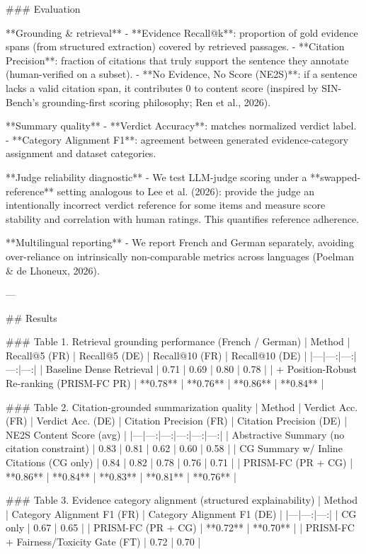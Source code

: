 ### Evaluation  

**Grounding & retrieval**
- **Evidence Recall@k**: proportion of gold evidence spans (from structured extraction) covered by retrieved passages.
- **Citation Precision**: fraction of citations that truly support the sentence they annotate (human-verified on a subset).
- **No Evidence, No Score (NE2S)**: if a sentence lacks a valid citation span, it contributes 0 to content score (inspired by SIN-Bench’s grounding-first scoring philosophy; Ren et al., 2026).

**Summary quality**
- **Verdict Accuracy**: matches normalized verdict label.
- **Category Alignment F1**: agreement between generated evidence-category assignment and dataset categories.

**Judge reliability diagnostic**
- We test LLM-judge scoring under a **swapped-reference** setting analogous to Lee et al. (2026): provide the judge an intentionally incorrect verdict reference for some items and measure score stability and correlation with human ratings. This quantifies reference adherence.

**Multilingual reporting**
- We report French and German separately, avoiding over-reliance on intrinsically non-comparable metrics across languages (Poelman & de Lhoneux, 2026).

---

## Results  

### Table 1. Retrieval grounding performance (French / German)  
| Method | Recall@5 (FR) | Recall@5 (DE) | Recall@10 (FR) | Recall@10 (DE) |
|---|---:|---:|---:|---:|
| Baseline Dense Retrieval | 0.71 | 0.69 | 0.80 | 0.78 |
| + Position-Robust Re-ranking (PRISM-FC PR) | **0.78** | **0.76** | **0.86** | **0.84** |

### Table 2. Citation-grounded summarization quality  
| Method | Verdict Acc. (FR) | Verdict Acc. (DE) | Citation Precision (FR) | Citation Precision (DE) | NE2S Content Score (avg) |
|---|---:|---:|---:|---:|---:|
| Abstractive Summary (no citation constraint) | 0.83 | 0.81 | 0.62 | 0.60 | 0.58 |
| CG Summary w/ Inline Citations (CG only) | 0.84 | 0.82 | 0.78 | 0.76 | 0.71 |
| PRISM-FC (PR + CG) | **0.86** | **0.84** | **0.83** | **0.81** | **0.76** |

### Table 3. Evidence category alignment (structured explainability)  
| Method | Category Alignment F1 (FR) | Category Alignment F1 (DE) |
|---|---:|---:|
| CG only | 0.67 | 0.65 |
| PRISM-FC (PR + CG) | **0.72** | **0.70** |
| PRISM-FC + Fairness/Toxicity Gate (FT) | 0.72 | 0.70 |

